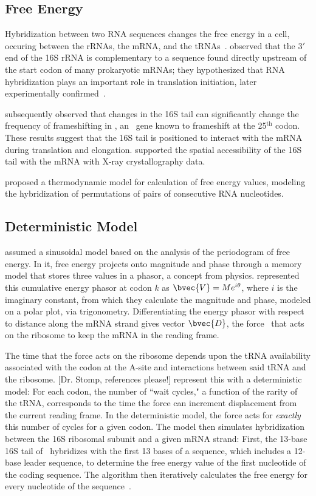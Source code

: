 \documentclass[12pt]{article}
\begin{document}
\subsection{Free Energy}
\label{freeenergy}

Hybridization between two RNA sequences changes the free energy in a
cell, occuring between the rRNAs, the mRNA, and the tRNAs~\cite{starmer}.
\citet{sd} observed that the $3'$ end of the 16S rRNA is complementary to a sequence found 
directly upstream of the start codon of many prokaryotic mRNAs; they hypothesized that RNA hybridization 
plays an important role in translation initiation, later
experimentally confirmed~\cite{hui,jacob}.

\citet{weiss87} subsequently observed that changes in the 16S tail can 
significantly change the frequency of frameshifting in \prfB, an \ecoli\ gene 
known to frameshift at the 25$^\textrm{th}$ codon.  These results suggest that 
the 16S tail is positioned to interact with the mRNA during
translation and elongation. 
\citet{xray} supported the spatial accessibility of the 16S tail with the mRNA with 
X-ray crystallography data.

\citet{freier} proposed a thermodynamic model for calculation of free energy values,
modeling the hybridization of permutations of pairs of consecutive RNA nucleotides.

\subsection{Deterministic Model}
\citet{lalit:mechanics} assumed a sinusoidal model 
based on the analysis of the periodogram of free energy. In it,
free energy projects onto magnitude and
phase through a memory model that stores three values
in a phasor, a concept from physics. 
\citeauthor{lalit:mechanics} represented this cumulative energy phasor
at codon $k$ as $\bvec{V} = Me^{i\theta}$, where $i$ is the imaginary
constant, from which they calculate the magnitude and phase, modeled
on a polar plot, via
trigonometry. Differentiating the energy phasor
with respect to distance along the mRNA strand gives 
vector $\bvec{D}$, the force~\cite{lalit:mechanics}
that acts on the ribosome to keep the mRNA in the reading frame.
 
The time that the force acts on the ribosome depends upon
the tRNA availability associated with the codon at the A-site 
and interactions between said tRNA and the ribosome. [Dr. Stomp, references please!]
\citeauthor{lalit:mechanics} represent this with a deterministic model: For each codon,
the number of ``wait cycles," a function of the rarity of the
tRNA, corresponds to the time the force can
increment displacement from the current reading frame.  In the
deterministic model, the force acts for \emph{exactly} this number
of cycles for a given codon. The model then
simulates hybridization between the
16S ribosomal subunit and a given mRNA strand: First, the 13-base 16S
tail of \ecoli\ hybridizes with the first 13 bases of a sequence,
which includes a 12-base leader sequence, to determine the free energy 
value of the first nucleotide of the coding sequence. The algorithm then iteratively calculates
the free energy for every nucleotide of the sequence~\cite{starmer}.
\end{document}
